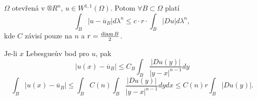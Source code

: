 \documentclass[12pt]{article}					%
\begin{document}
\begin{veta}
	$Ω$ otevřená v $®R^n$, $u \in W^{1, 1}(Ω)$. Potom $\forall B \subset Ω$ platí
	$$ \int_B |u - \overline{u}_B| dλ^n ≤ c·r·\int_B |Du| dλ^n,  $$
	kde $C$ závisí pouze na $n$ a $r = \frac{\operatorname{diam} B}{2}$.

	\begin{dukazin}
		Je-li $x$ Lebesgueův bod pro $u$, pak
		$$ |u(x) - \overline{u}_B| ≤ C_B \int_B \frac{|Du(y)|}{|y - x|^{n - 1}} dy $$
		$$ \int_B |u(x) - \overline{u}_B| ≤ \int_B C(n) \int_B \frac{|D u(y)|}{|y - x|^{n - 1}} dy dx ≤ C(n) r \int_B |Du(y)|. $$
	\end{dukazin}
\end{veta}
\end{document}
